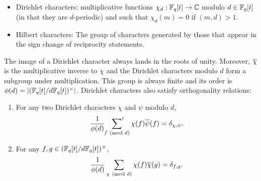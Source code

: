 \documentclass[12pt,reqno,oneside]{amsart}
\begin{document}
    \begin{itemize}
        \item Dirichlet characters: multiplicative functions $\chi_{d}:\mathbb{F}_{q}[t] \to \mathbb{C}$ modulo $d \in \mathbb{F}_{q}[t]$ (in that they are $d$-periodic) and such that $\chi_{d}(m) = 0$ if $(m,d) > 1$.
        \item Hilbert characters: The group of characters generated by those that appear in the sign change of reciprocity statements.
    \end{itemize}
    
    The image of a Dirichlet character always lands in the roots of unity. Moreover, $\overline{\chi}$ is the multiplicative inverse to $\chi$ and the Dirichlet characters modulo $d$ form a subgroup under multiplication. This group is always finite and its order is $\phi(d) = |(\mathbb{F}_{q}[t]/d\mathbb{F}_{q}[t])^{\times}|$. Dirichlet characters also satisfy orthogonality relations:

    \begin{theorem}
        \phantom{ }
        \begin{enumerate}[label=(\roman*)]
          \item For any two Dirichlet characters $\chi$ and $\psi$ modulo $d$,
          \[
            \frac{1}{\phi(d)}\sideset{}{'}\sum_{f \ \left(\text{mod }d\right)}\chi(f)\overline{\psi}(f) = \delta_{\chi,\psi}.
          \]
          \item For any $f,g \in (\mathbb{F}_{q}[t]/d\mathbb{F}_{q}[t])^{\times}$,
          \[
            \frac{1}{\phi(d)}\sum_{\chi \ \left(\text{mod }d\right)}\chi(f)\overline{\chi}(g) = \delta_{f,g}.
          \]
        \end{enumerate}
    \end{theorem}
\end{document}
